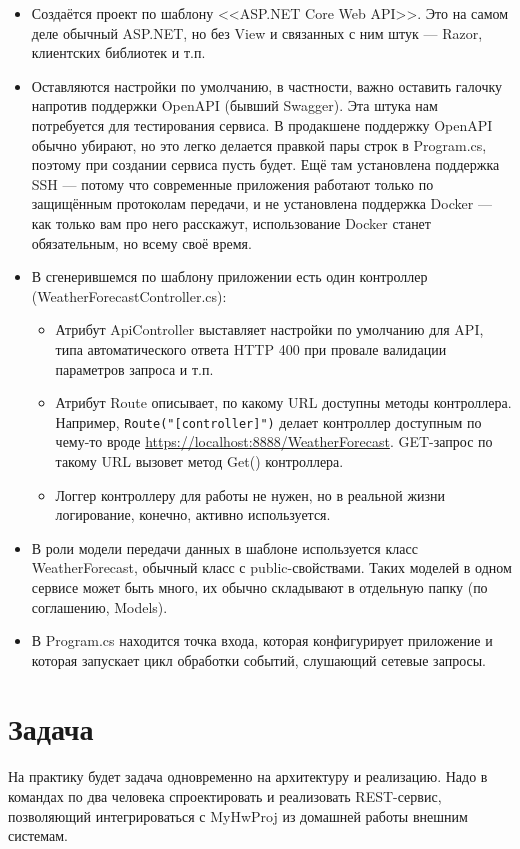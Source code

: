 \documentclass[a5paper]{article}
\begin{document}
\begin{itemize}
    \item Создаётся проект по шаблону <<ASP.NET Core Web API>>. Это на самом деле обычный ASP.NET, но без View и связанных с ним штук --- Razor, клиентских библиотек и т.п.
    \item Оставляются настройки по умолчанию, в частности, важно оставить галочку напротив поддержки OpenAPI (бывший Swagger). Эта штука нам потребуется для тестирования сервиса. В продакшене поддержку OpenAPI обычно убирают, но это легко делается правкой пары строк в Program.cs, поэтому при создании сервиса пусть будет. Ещё там установлена поддержка SSH --- потому что современные приложения работают только по защищённым протоколам передачи, и не установлена поддержка Docker --- как только вам про него расскажут, использование Docker станет обязательным, но всему своё время.
    \item В сгенерившемся по шаблону приложении есть один контроллер (WeatherForecastController.cs):
    \begin{itemize}
        \item Атрибут ApiController выставляет настройки по умолчанию для API, типа автоматического ответа HTTP 400 при провале валидации параметров запроса и т.п.
        \item Атрибут Route описывает, по какому URL доступны методы контроллера. Например, \verb|Route("[controller]")| делает контроллер доступным по чему-то вроде \url{https://localhost:8888/WeatherForecast}. GET-запрос по такому URL вызовет метод Get() контроллера.
        \item Логгер контроллеру для работы не нужен, но в реальной жизни логирование, конечно, активно используется.
    \end{itemize}
    \item В роли модели передачи данных в шаблоне используется класс WeatherForecast, обычный класс с public-свойствами. Таких моделей в одном сервисе может быть много, их обычно складывают в отдельную папку (по соглашению, Models).
    \item В Program.cs находится точка входа, которая конфигурирует приложение и которая запускает цикл обработки событий, слушающий сетевые запросы.
\end{itemize}

\section{Задача}

На практику будет задача одновременно на архитектуру и реализацию. Надо в командах по два человека спроектировать и реализовать REST-сервис, позволяющий интегрироваться с MyHwProj из домашней работы внешним системам.
\end{document}
